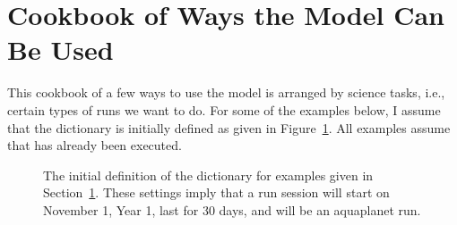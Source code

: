 \section{Cookbook of Ways the Model Can Be Used}  \label{sec:cookbook}

This cookbook of a few ways to use the model is arranged by science
tasks, i.e., certain types of runs we want to do.  For some of the
examples below, I assume that the dictionary
 is initially defined as given in
Figure~\ref{fig:defn.of.inputs}.  All examples assume that
 has already been executed.


\begin{latexonly}
\begin{figure}[tp]
\begin{codeblock}
\end{codeblock}

\caption{The initial definition of the  dictionary for 
	examples given in Section~\ref{sec:cookbook}.  These settings
	imply that a run session will start on November 1, Year 1,
	last for 30 days, and will be an aquaplanet run.}
\label{fig:defn.of.inputs}
\end{figure}
\end{latexonly}

